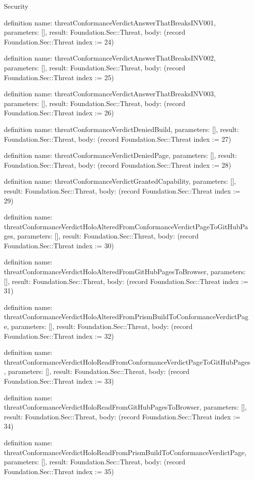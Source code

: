 \begin{lexlean}{Security}
\begin{semanticmodule}
definition{
  name: threatConformanceVerdictAnswerThatBreaksINV001,
  parameters: [],
  result: Foundation.Sec::Threat,
  body: (record Foundation.Sec::Threat {index := 24})
}

definition{
  name: threatConformanceVerdictAnswerThatBreaksINV002,
  parameters: [],
  result: Foundation.Sec::Threat,
  body: (record Foundation.Sec::Threat {index := 25})
}

definition{
  name: threatConformanceVerdictAnswerThatBreaksINV003,
  parameters: [],
  result: Foundation.Sec::Threat,
  body: (record Foundation.Sec::Threat {index := 26})
}

definition{
  name: threatConformanceVerdictDeniedBuild,
  parameters: [],
  result: Foundation.Sec::Threat,
  body: (record Foundation.Sec::Threat {index := 27})
}

definition{
  name: threatConformanceVerdictDeniedPage,
  parameters: [],
  result: Foundation.Sec::Threat,
  body: (record Foundation.Sec::Threat {index := 28})
}

definition{
  name: threatConformanceVerdictGrantedCapability,
  parameters: [],
  result: Foundation.Sec::Threat,
  body: (record Foundation.Sec::Threat {index := 29})
}

definition{
  name: threatConformanceVerdictHoloAlteredFromConformanceVerdictPageToGitHubPages,
  parameters: [],
  result: Foundation.Sec::Threat,
  body: (record Foundation.Sec::Threat {index := 30})
}

definition{
  name: threatConformanceVerdictHoloAlteredFromGitHubPagesToBrowser,
  parameters: [],
  result: Foundation.Sec::Threat,
  body: (record Foundation.Sec::Threat {index := 31})
}

definition{
  name: threatConformanceVerdictHoloAlteredFromPrismBuildToConformanceVerdictPage,
  parameters: [],
  result: Foundation.Sec::Threat,
  body: (record Foundation.Sec::Threat {index := 32})
}

definition{
  name: threatConformanceVerdictHoloReadFromConformanceVerdictPageToGitHubPages,
  parameters: [],
  result: Foundation.Sec::Threat,
  body: (record Foundation.Sec::Threat {index := 33})
}

definition{
  name: threatConformanceVerdictHoloReadFromGitHubPagesToBrowser,
  parameters: [],
  result: Foundation.Sec::Threat,
  body: (record Foundation.Sec::Threat {index := 34})
}

definition{
  name: threatConformanceVerdictHoloReadFromPrismBuildToConformanceVerdictPage,
  parameters: [],
  result: Foundation.Sec::Threat,
  body: (record Foundation.Sec::Threat {index := 35})
}


\end{semanticmodule}
\end{lexlean}
